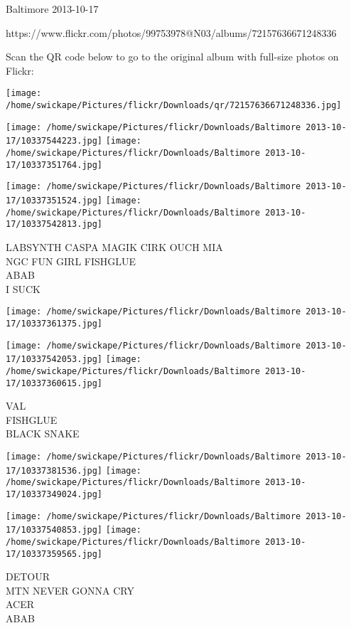\documentclass[10pt,letterpaper]{article}
\begin{document}
Baltimore 2013-10-17

https://www.flickr.com/photos/99753978@N03/albums/72157636671248336

Scan the QR code below to go to the original album with full-size photos on Flickr:

\texttt{[image: /home/swickape/Pictures/flickr/Downloads/qr/72157636671248336.jpg]}
\pagebreak

\texttt{[image: /home/swickape/Pictures/flickr/Downloads/Baltimore 2013-10-17/10337544223.jpg]}
\texttt{[image: /home/swickape/Pictures/flickr/Downloads/Baltimore 2013-10-17/10337351764.jpg]}

\texttt{[image: /home/swickape/Pictures/flickr/Downloads/Baltimore 2013-10-17/10337351524.jpg]}
\texttt{[image: /home/swickape/Pictures/flickr/Downloads/Baltimore 2013-10-17/10337542813.jpg]}

LABSYNTH CASPA MAGIK CIRK OUCH MIA\\
NGC FUN GIRL FISHGLUE\\
ABAB\\
I SUCK\\
\pagebreak

\texttt{[image: /home/swickape/Pictures/flickr/Downloads/Baltimore 2013-10-17/10337361375.jpg]}

\vspace{0.25in}
\texttt{[image: /home/swickape/Pictures/flickr/Downloads/Baltimore 2013-10-17/10337542053.jpg]}
\texttt{[image: /home/swickape/Pictures/flickr/Downloads/Baltimore 2013-10-17/10337360615.jpg]}

VAL\\
FISHGLUE\\
BLACK SNAKE\\
\pagebreak

\texttt{[image: /home/swickape/Pictures/flickr/Downloads/Baltimore 2013-10-17/10337381536.jpg]}
\texttt{[image: /home/swickape/Pictures/flickr/Downloads/Baltimore 2013-10-17/10337349024.jpg]}

\texttt{[image: /home/swickape/Pictures/flickr/Downloads/Baltimore 2013-10-17/10337540853.jpg]}
\texttt{[image: /home/swickape/Pictures/flickr/Downloads/Baltimore 2013-10-17/10337359565.jpg]}

DETOUR\\
MTN NEVER GONNA CRY\\
ACER\\
ABAB\\
\pagebreak
\end{document}
